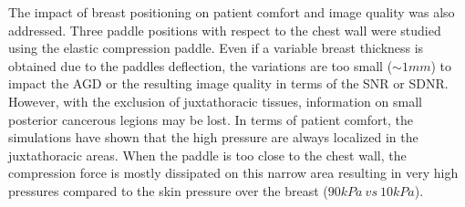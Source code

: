 The impact of breast positioning on patient comfort and image quality was also addressed. Three paddle positions with respect to the chest wall were studied using the elastic compression paddle. Even if a variable breast thickness is obtained due to the paddles deflection, the variations are too small ($\sim 1mm$) to impact the AGD or the resulting image quality in terms of the SNR or SDNR. However, with the exclusion of juxtathoracic tissues, information on  small posterior cancerous legions may be lost. In terms of patient comfort, the simulations have shown that the high pressure are always localized in the juxtathoracic areas. When the paddle is too close to the chest wall, the compression force is mostly dissipated on this narrow area resulting in very high pressures compared to the skin pressure over the breast ($90kPa\ vs\ 10kPa$).
